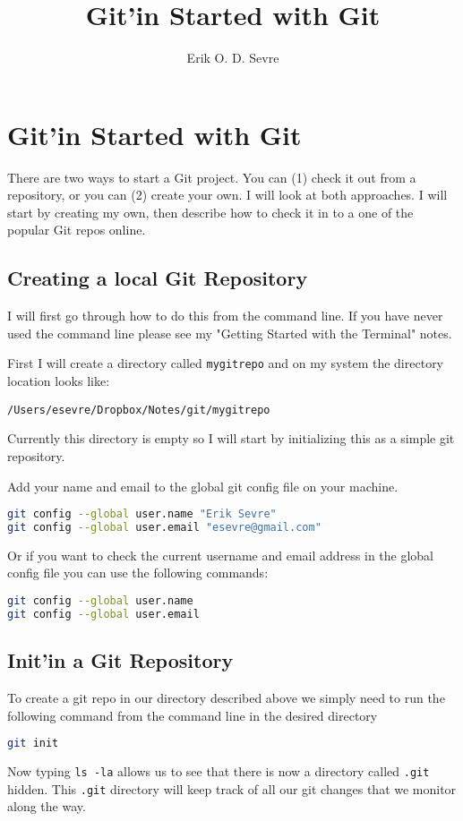 \documentclass[a4paper]{spie} %
\author{Erik O. D. Sevre}
\title{Git'in Started with Git}
\begin{document}
\maketitle

\section*{Git'in Started with Git}

There are two ways to start a Git project. You can (1) check it out from a repository, or you can (2) create your own. I will look at both approaches. I will start by creating my own, then describe how to check it in to a one of the popular Git repos online.

\subsection*{Creating a local Git Repository}

I will first go through how to do this from the command line. If you have never used the command line please see my "Getting Started with the Terminal" notes.

First I will create a directory called \texttt{mygitrepo} and on my system the directory location looks like:
\begin{lstlisting}
/Users/esevre/Dropbox/Notes/git/mygitrepo
\end{lstlisting}

Currently this directory is empty so I will start by initializing this as a simple git repository.

Add your name and email to the global git config file on your machine.
\begin{lstlisting}[language=bash]
git config --global user.name "Erik Sevre"
git config --global user.email "esevre@gmail.com"
\end{lstlisting}

Or if you want to check the current username and email address in the global config file you can use the following commands:
\begin{lstlisting}[language=bash]
git config --global user.name
git config --global user.email
\end{lstlisting}


\subsection{Init'in a Git Repository}
To create a git repo in our directory described above we simply need to run the following command from the command line in the desired directory
\begin{lstlisting}[language=bash]
git init
\end{lstlisting}

Now typing \texttt{ls -la} allows us to see that there is now a directory called \texttt{.git} hidden. This \texttt{.git} directory will keep track of all our git changes that we monitor along the way.
\end{document}
